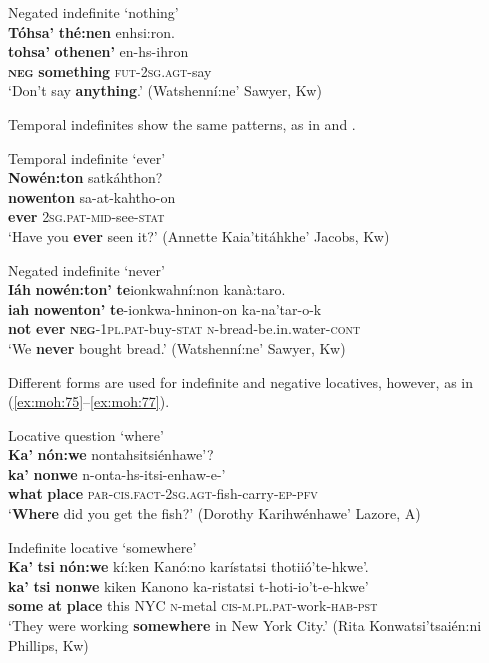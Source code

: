 \documentclass[output=paper,colorlinks,citecolor=brown]{langscibook}
\begin{document}
{\ea\label{ex:moh:72}Negated indefinite ‘nothing’\\
    \glll \textbf{Tóhsa’}   \textbf{thé:nen} enhsi:ron. \\
         \textbf{tohsa’} \textbf{othenen’} en-hs-ihron\\
         \textbf{\textsc{neg}} \textbf{something} \textsc{fut-2sg.agt-}say\\
    \glt ‘Don’t say \textbf{anything}.’ (Watshenní:ne’ Sawyer, Kw)
\z}

Temporal indefinites show the same patterns, as in  and .

\ea\label{ex:moh:73}Temporal indefinite ‘ever’\\
    \glll \textbf{Nowén:ton} satkáhthon? \\
         \textbf{nowenton} sa-at-kahtho-on \\
         \textbf{ever} \textsc{2sg.pat-mid-}see-\textsc{stat}\\
    \glt ‘Have you \textbf{ever} seen it?’ (Annette Kaia’titáhkhe’ Jacobs, Kw)
\z

\ea\label{ex:moh:74}Negated indefinite ‘never’\\
    \glll \textbf{Iáh} \textbf{nowén:ton’} \textbf{te}ionkwahní:non kanà:taro. \\
         \textbf{iah} \textbf{nowenton’} \textbf{te}-ionkwa-hninon-on ka-na’tar-o-k\\
         \textbf{not} \textbf{ever} \textbf{\textsc{neg}}\textsc{-1pl.pat}-buy-\textsc{stat} \textsc{n}-bread-be.in.water\textsc{-cont}\\
    \glt ‘We \textbf{never} bought bread.’ (Watshenní:ne’ Sawyer, Kw)
\z

Different forms are used for indefinite and negative locatives, however, as in (\ref{ex:moh:75}--\ref{ex:moh:77}).


\ea\label{ex:moh:75}Locative question ‘where’\\
    \glll \textbf{Ka’} \textbf{nón:we} nontahsitsiénhawe’? \\
         \textbf{ka’} \textbf{nonwe} n-onta-hs-itsi-enhaw-e-’\\
         \textbf{what} \textbf{place} \textsc{par-cis.fact-2sg.agt}-fish-carry-\textsc{ep-pfv}\\
    \glt ‘\textbf{Where} did you get the fish?’ (Dorothy Karihwénhawe’ Lazore, A)
\z

\ea\label{ex:moh:76}Indefinite locative ‘somewhere’\\
    \glll \textbf{Ka’} \textbf{tsi} \textbf{nón:we} kí:ken Kanó:no karístatsi thotiió’te-hkwe’.\\
         \textbf{ka’} \textbf{tsi} \textbf{nonwe} kiken Kanono ka-ristatsi t-hoti-io’t-e-hkwe’ \\
         \textbf{some} \textbf{at} \textbf{place} this NYC \textsc{n}-metal \textsc{cis-m.pl.pat}-work-\textsc{hab-pst}\\
    \glt ‘They were working \textbf{somewhere} in New York City.’ (Rita Konwatsi’tsaién:ni Phillips, Kw)
\z
\end{document}
